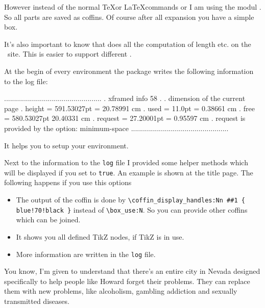 \documentclass[openany,12pt,tocdepth=3]{ltx-md}
\begin{document}
However instead of the normal \TeX or \LaTeX  commands  or 
I am using the modul . So all parts are saved as coffins. Of course after
all expansion you have a simple box.

It's also important to know that  does all the computation
of length etc. on the \LaTeXe\ site. This is easier to support different
. 

At the begin of every environment the package writes the following information 
to the log file:
\begin{ltxexample}[caption={Info dimension},result=false,]
.................................................
. xframed info 58
. 
.  dimension of the current page
.  height = 591.53027pt = 20.78991 cm
.  used = 11.0pt = 0.38661 cm
.  free = 580.53027pt 20.40331 cm
.  request = 27.20001pt = 0.95597 cm
.  request is provided by the option: minimum-space
.................................................
\end{ltxexample}

It helps you to setup your environment. 

Next to the information to the \texttt{log} file
I provided some helper methods which will be displayed
if you set  to \texttt{true}.
An example is shown at the title page. The following
happens if you use this options
\begin{itemize}
 \item The output of the coffin is done by \verb+\coffin_display_handles:Nn ##1 { blue!70!black }+ instead of \verb+\box_use:N+.
  So you can provide other coffins which can be joined. 
 \item  It shows you all defined TikZ nodes, if TikZ is in use.
 \item More information are written in the \texttt{log} file.
\end{itemize}



\begin{ltxexample}[caption={Example \Opt{developer-info}},result=true,]
\begin{xframed}[developer-info=true,margin=1cm,skip=1cm,
 first-title={Sheldon Cooper Quote},
 last-foot={End Sheldon Cooper Quote}]
  You know, I'm given to understand that there's an entire 
  city in Nevada designed specifically to help people like 
  Howard forget their problems. They can replace them with
  new problems, like alcoholism, gambling addiction and 
  sexually transmitted diseases.   
\end{xframed}
\end{ltxexample}
\end{document}
